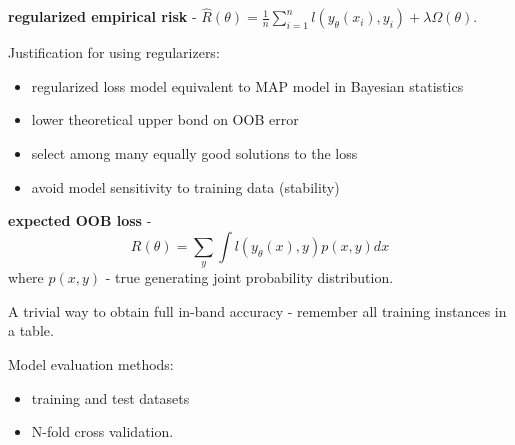 \documentclass{article}
\newcommand{\para}[0]{\par\vspace{0.2cm}\noindent}
\newcommand{\define}[2]{\textbf{#1} - {#2}.  \para}
\begin{document}
\define{regularized empirical risk}
           {$\hat R(\theta) = \frac{1}{n} \sum_{i=1}^n l(y_\theta(x_i), y_i) + \lambda \Omega (\theta)$}

Justification for using regularizers:
\begin{itemize}
    \item{regularized loss model equivalent to MAP model in Bayesian statistics}
    \item{lower theoretical upper bond on OOB error}
    \item{select among many equally good solutions to the loss}
    \item{avoid model sensitivity to training data (stability)}
\end{itemize}

\define{expected OOB loss}{
    $$R(\theta) = \sum_y \int l(y_\theta(x), y) p(x, y) dx$$
    where $p(x, y)$ - true generating joint probability distribution}

A trivial way to obtain full in-band accuracy - remember all training instances in a table.  \\
\par
Model evaluation methods:
\begin{itemize}
    \item{training and test datasets}
    \item{N-fold cross validation.}
\end{itemize}
\end{document}
